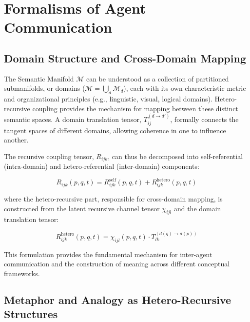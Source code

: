 \chapter{Formalisms of Agent Communication}
\label{ch:formalisms_of_agent_communication}


\section{Domain Structure and Cross-Domain Mapping}
\label{sec:domain_structure_and_cross_domain_mapping}

The Semantic Manifold \(\mathcal{M}\) can be understood as a collection of partitioned submanifolds, or domains (\(\mathcal{M} = \bigcup_d \mathcal{M}_d\)), each with its own characteristic metric and organizational principles (e.g., linguistic, visual, logical domains). Hetero-recursive coupling provides the mechanism for mapping between these distinct semantic spaces. A domain translation tensor, \(T_{ij}^{(d \to d')}\), formally connects the tangent spaces of different domains, allowing coherence in one to influence another.

The recursive coupling tensor, \(R_{ijk}\), can thus be decomposed into self-referential (intra-domain) and hetero-referential (inter-domain) components:

\begin{equation}
R_{ijk}(p, q, t) = R_{ijk}^{\text{self}}(p, q, t) + R_{ijk}^{\text{hetero}}(p, q, t)
\end{equation}

where the hetero-recursive part, responsible for cross-domain mapping, is constructed from the latent recursive channel tensor \(\chi_{ijl}\) and the domain translation tensor:

\begin{equation}
R_{ijk}^{\text{hetero}}(p, q, t) = \chi_{ijl}(p, q, t) \cdot T_{lk}^{(d(q) \to d(p))}
\end{equation}

This formulation provides the fundamental mechanism for inter-agent communication and the construction of meaning across different conceptual frameworks.


\section{Metaphor and Analogy as Hetero-Recursive Structures}
\label{sec:metaphor_and_analogy_as_hetero_recursive_structures}

